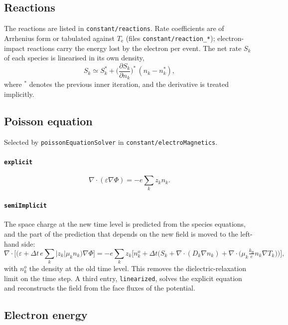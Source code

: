 \documentclass[11pt,a4paper]{article}
\newcommand{\kw}[1]{\texttt{#1}}
\newcommand{\kB}{k_\mathrm{B}}
\newcommand{\Te}{T_\mathrm{e}}
\newcommand{\pd}[2]{\frac{\partial #1}{\partial #2}}
\begin{document}
\subsection{Reactions}

The reactions are listed in \kw{constant/reactions}. Rate coefficients are of
Arrhenius form or tabulated against $\Te$ (files \kw{constant/reaction\_*});
electron-impact reactions carry the energy lost by the electron per event.
The net rate $S_k$ of each species is linearised in its own density,
\begin{equation}
S_k \simeq S_k^{*} + \Big(\pd{S_k}{n_k}\Big)^{*}\,(n_k-n_k^{*}) ,
\end{equation}
where $^{*}$ denotes the previous inner iteration, and the derivative is
treated implicitly.

\subsection{Poisson equation}

Selected by \kw{poissonEquationSolver} in \kw{constant/electroMagnetics}.

\paragraph{\kw{explicit}}
\begin{equation}
\nabla\cdot(\varepsilon\nabla\Phi) = -e\sum_k z_k n_k .
\end{equation}

\paragraph{\kw{semiImplicit}} The space charge at the new time level is
predicted from the species equations, and the part of the prediction that
depends on the new field is moved to the left-hand side:
\begin{equation}
\nabla\cdot\Big[\Big(\varepsilon + \Delta t\,e\sum_k |z_k|\mu_k n_k\Big)\nabla\Phi\Big]
 = -e\sum_k z_k\Big[n_k^{o} + \Delta t\Big(S_k + \nabla\cdot(D_k\nabla n_k)
   + \nabla\cdot\big(\mu_k\tfrac{\kB}{e}n_k\nabla T_k\big)\Big)\Big] ,
\label{eq:semi}
\end{equation}
with $n_k^{o}$ the density at the old time level. This removes the
dielectric-relaxation limit on the time step. A third entry,
\kw{linearized}, solves the explicit equation and reconstructs the field from
the face fluxes of the potential.

\subsection{Electron energy}
\end{document}
